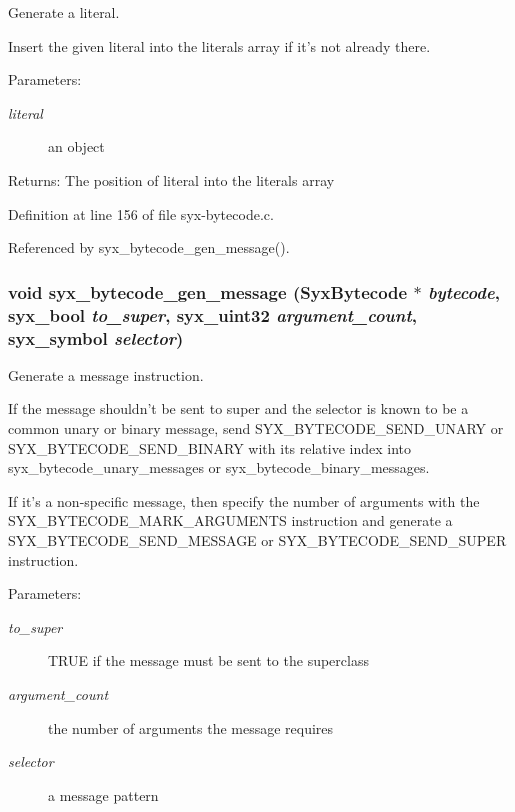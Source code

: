 Generate a literal.

Insert the given literal into the literals array if it's not already there.

\begin{Desc}
\item[Parameters:]
\begin{description}
\item[{\em literal}]an object \end{description}
\end{Desc}
\begin{Desc}
\item[Returns:]The position of literal into the literals array \end{Desc}


Definition at line 156 of file syx-bytecode.c.

Referenced by syx\_\-bytecode\_\-gen\_\-message().\hypertarget{syx-bytecode_8c_6e08f49fece1127fa50ab8be456774d2}{
\subsubsection{\setlength{\rightskip}{0pt plus 5cm}void syx\_\-bytecode\_\-gen\_\-message ({\bf SyxBytecode} $\ast$ {\em bytecode}, \/  {\bf syx\_\-bool} {\em to\_\-super}, \/  {\bf syx\_\-uint32} {\em argument\_\-count}, \/  {\bf syx\_\-symbol} {\em selector})}}
\label{syx-bytecode_8c_6e08f49fece1127fa50ab8be456774d2}


Generate a message instruction.

If the message shouldn't be sent to super and the selector is known to be a common unary or binary message, send SYX\_\-BYTECODE\_\-SEND\_\-UNARY or SYX\_\-BYTECODE\_\-SEND\_\-BINARY with its relative index into syx\_\-bytecode\_\-unary\_\-messages or syx\_\-bytecode\_\-binary\_\-messages.

If it's a non-specific message, then specify the number of arguments with the SYX\_\-BYTECODE\_\-MARK\_\-ARGUMENTS instruction and generate a SYX\_\-BYTECODE\_\-SEND\_\-MESSAGE or SYX\_\-BYTECODE\_\-SEND\_\-SUPER instruction.

\begin{Desc}
\item[Parameters:]
\begin{description}
\item[{\em to\_\-super}]TRUE if the message must be sent to the superclass \item[{\em argument\_\-count}]the number of arguments the message requires \item[{\em selector}]a message pattern \end{description}
\end{Desc}


